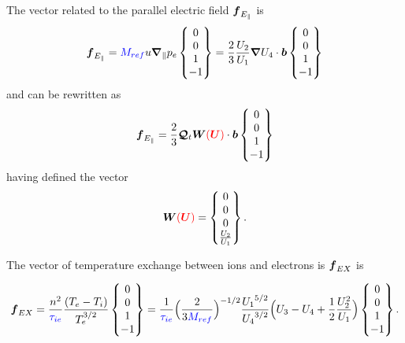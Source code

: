 \documentclass[a4paper,10pt]{article}
\newcommand{\bm}[1]{\text{\boldmath$#1$\unboldmath}}
\newcommand{\Grad}{\bm{\nabla}}
\renewcommand{\b}{\bm{b}}
\newcommand{\DiscFunc}[1]{\bm{#1}}
\newcommand{\SecOrdTens}[1]{\bm{\mathcal{#1}}}
\renewcommand{\u}{\DiscFunc{U}}
\newcommand{\G}{\SecOrdTens{Q}}
\newcommand{\Gt}{\G_t}
\newcommand{\W}{\DiscFunc{W}}
\newcommand{\Gradpar}{\Grad_{\parallel}}
\newcommand{\nd}[1]{{\color{blue} #1\color{black}}} %
\newcommand{\fo}[1]{{ \color{red} ( #1 )\color{black} }} %
\def\Mref{\nd{M_{ref}}}
\def\tiea{\nd{\tau_{ie}}}
\begin{document}
The  vector related to the parallel electric field $\bm{f}_{E_{\parallel}}$ is
\begin{equation*}
 \bm{f}_{E_{\parallel}}  = \Mref u\Gradpar p_e \begin{Bmatrix}
                     0 \\
                     0\\
                     1\\
                    -1
       \end{Bmatrix}= \frac{2}{3} \frac{U_2}{U_1}\Grad U_4\cdot \b \begin{Bmatrix}
                     0 \\
                     0\\
                     1\\
                    -1
       \end{Bmatrix} 
\end{equation*}
and can be rewritten as 
\begin{equation*}
 \bm{f}_{E_{\parallel}}  = \frac{2}{3} \Gt \W\fo{\u}\cdot \b \begin{Bmatrix}
                     0 \\
                     0\\
                     1\\
                    -1\\
       \end{Bmatrix} 
\end{equation*}
having defined the vector
\[
 \W\fo{\u} = \begin{Bmatrix}
                     0 \\
                     0\\
                     0\\
                    \frac{U_2}{U_1}\\
              \end{Bmatrix}.
\]


The  vector of temperature exchange between ions and electrons is $\bm{f}_{EX}$ is
  
\begin{equation*}
 \bm{f}_{EX}  = \frac{n^2}{\tiea}\frac{(T_e-T_i)}{T_e^{3/2}} \begin{Bmatrix}
                     0 \\
                     0\\
                     1\\
                    -1
       \end{Bmatrix}= \frac{1}{\tiea}\Big(\frac{2}{3  \Mref }\Big)^{-1/2}\frac{{U_1}^{5/2}}{{U_4}^{3/2}}\Big(U_3-U_4+ \frac{1}{2}\frac{U_2^2}{U_1}\Big) \begin{Bmatrix}
                     0 \\
                     0\\
                     1\\
                    -1
       \end{Bmatrix}.
\end{equation*}
\end{document}
